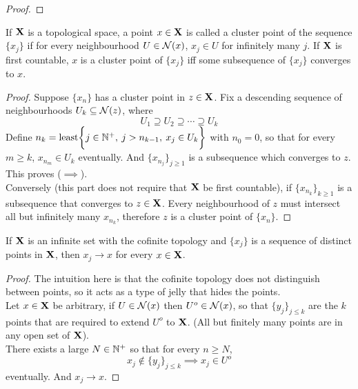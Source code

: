 \documentclass[../../main.tex]{subfiles}
\begin{document}
\begin{wts}
\end{wts}
\begin{proof}
    
\end{proof}
\newpage

\begin{wts}
    If ${\mathbf{X}}$ is a topological space, a point $x\in{\mathbf{X}}$ is called a cluster point of the sequence $\{x_j\}$ if for every neighbourhood $U\in\mathcal{N}(x)$, $x_j\in U$ for infinitely many $j$. If ${\mathbf{X}}$ is first countable, $x$ is a cluster point of $\{x_j\}$ iff some subsequence of $\{x_j\}$ converges to $x$.
\end{wts}
\begin{proof}
    Suppose $\{x_n\}$ has a cluster point in $z\in {\mathbf{X}}$. Fix a descending sequence of neighbourhoods $U_k\subseteq \mathcal{N}(z)$, where
    \[
        U_1\supseteq U_2\supseteq\cdots\supseteq U_k
    \]
    Define $n_k = \operatorname{least}\biggl\{{j\in \mathbb{N}^+,\: j>n_{k-1},\: x_j\in U_k}\biggr\}
    $ with $n_0=0$, so that for every $m\geq k$, $x_{n_m}\in U_k$ eventually. And $\{x_{n_j}\}_{j\geq 1}$ is a subsequence which converges to $z$. This proves ($\implies$).\\
    
    Conversely (this part does not require that ${\mathbf{X}}$ be first countable), if $\{x_{n_k}\}_{k\geq 1}$ is a subsequence that converges to $z\in{\mathbf{X}}$. Every neighbourhood of $z$ must intersect all but infinitely many $x_{n_k}$, therefore $z$ is a cluster point of $\{x_n\}$.
\end{proof}
\newpage




\begin{wts}
    If ${\mathbf{X}}$ is an infinite set with the cofinite topology and $\{x_j\} $ is a sequence of distinct points in ${\mathbf{X}}$, then $x_j\to x$ for every $x\in{\mathbf{X}}$.   
\end{wts}
\begin{proof}
    The intuition here is that the cofinite topology does not distinguish between points, so it acts as a type of jelly that hides the points.\\

    Let $x\in{\mathbf{X}}$ be arbitrary, if $U\in\mathcal{N}(x)$ then $U^o\in\mathcal{N}(x)$, so that $\{y_j\}_{j\leq k}$ are the $k$ points that are required to extend $U^o$ to ${\mathbf{X}}$. (All but finitely many points are in any open set of ${\mathbf{X}}$).\\

    There exists a large $N\in\mathbb{N}^+$ so that for every $n\geq N$, 
    \[
        x_j\notin\{y_j\}_{j\leq k}\implies x_j\in U^o
    \]
    eventually. And $x_j\to x$.
\end{proof}
\newpage
\end{document}

